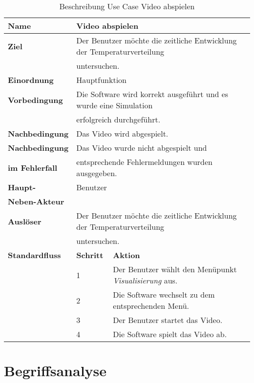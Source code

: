 \begin{table} [H]
	\centering
	\begin{tabular}{|l|l|l|}
		\hline
		\textbf{Name} 			& \multicolumn{2}{|l|}{Video abspielen}  \\
		\hline
		\textbf{Ziel} 			& \multicolumn{2}{|l|}{Der Benutzer möchte die zeitliche Entwicklung der Temperaturverteilung  }\\ 
		& \multicolumn{2}{|l|}{untersuchen.}\\
		\hline
		\textbf{Einordnung}		& \multicolumn{2}{|l|}{Hauptfunktion}\\
		\hline
		\textbf{Vorbedingung}	& \multicolumn{2}{|l|}{Die Software wird korrekt ausgeführt und es wurde eine Simulation} \\
		& \multicolumn{2}{|l|}{ erfolgreich durchgeführt.} \\
		\hline
		\textbf{Nachbedingung}	& \multicolumn{2}{|l|}{Das Video wird abgespielt.}\\
		\hline
		\textbf{Nachbedingung} 	& \multicolumn{2}{|l|}{Das Video wurde nicht abgespielt und}\\
		\textbf{im Fehlerfall}	& \multicolumn{2}{|l|}{entsprechende Fehlermeldungen wurden ausgegeben.}\\
		\hline
		\textbf{Haupt-} 		& \multicolumn{2}{|l|}{Benutzer}\\
		\textbf{Neben-Akteur}	& \multicolumn{2}{|l|}{	}			\\
		\hline
		\textbf{Auslöser} 		& \multicolumn{2}{|l|}{Der Benutzer möchte die zeitliche Entwicklung der Temperaturverteilung} \\
		& \multicolumn{2}{|l|}{untersuchen.}\\
		\hline 
		\textbf{Standardfluss} & \textbf{Schritt} & \textbf{Aktion} \\
		\hline
		&	1	& Der Benutzer wählt den Menüpunkt \emph{Visualisierung} aus. \\
		\cline{2-3}
		&	2	& Die Software wechselt zu dem entsprechenden Menü.\\
		\cline{2-3}
		&	3	& Der Benutzer startet das Video.\\
		\cline{2-3}
		&	4	& Die Software spielt das Video ab.\\
		\hline
	\end{tabular}
	\caption{Beschreibung Use Case Video abspielen}
	\label{Beschreibung Use Case Video_abspielen}
\end{table}

\section{Begriffsanalyse}

